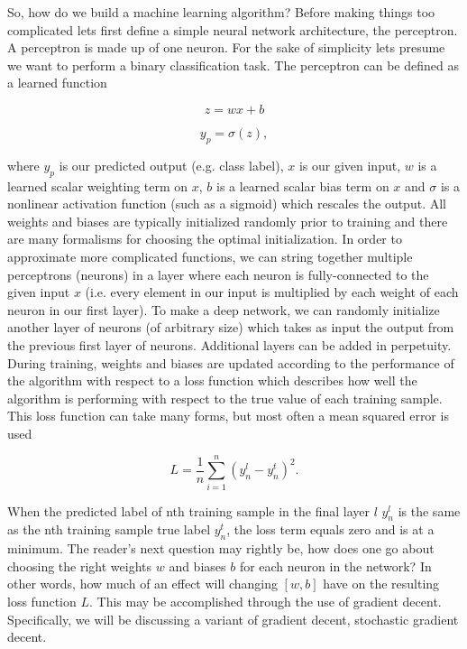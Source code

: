 %
%
So, how do we build a machine learning algorithm? Before making things too complicated lets first define a simple neural network architecture, the perceptron. A perceptron is made up of one neuron. For the sake of simplicity lets presume we want to perform a binary classification task. The perceptron can be defined as a learned function

\begin{equation}
    z = w x + b
\end{equation}{}

\begin{equation}
    y_{p} = \sigma(z),
\end{equation}{}

where $y_{p}$ is our predicted output (e.g. class label), $x$ is our given input, $w$ is a learned scalar weighting term on $x$, $b$ is a learned scalar bias term on $x$ and $\sigma$ is a nonlinear activation function (such as a sigmoid) which rescales the output. All weights and biases are typically initialized randomly prior to training and there are many formalisms for choosing the optimal initialization. In order to approximate more complicated functions, we can string together multiple perceptrons (neurons) in a layer where each neuron is fully-connected to the given input $x$ (i.e. every element in our input is multiplied by each weight of each neuron in our first layer). To make a deep network, we can randomly initialize another layer of neurons (of arbitrary size) which takes as input the output from the previous first layer of neurons. Additional layers can be added in perpetuity. During training, weights and biases are updated according to the performance of the algorithm with respect to a loss function which describes how well the algorithm is performing with respect to the true value of each training sample. This loss function can take many forms, but most often a mean squared error is used

\begin{equation}
    L = \frac{1}{n} \sum_{i=1}^{n}(y^{l}_n-y^{t}_n)^2.
\end{equation}{}

%
%
When the predicted label of nth training sample in the final layer $l$ $y^{l}_n$ is the same as the nth training sample true label $y^{t}_n$, the loss term equals zero and is at a minimum. The reader's next question may rightly be, how does one go about choosing the right weights $w$ and biases $b$ for each neuron in the network? In other words, how much of an effect will changing $[w,b]$ have on the resulting loss function $L$. This may be accomplished through the use of gradient decent. Specifically, we will be discussing a variant of gradient decent, stochastic gradient decent.

